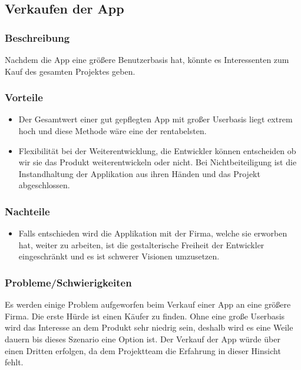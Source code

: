 \documentclass[FIPLY_base.tex]{subfiles}
\begin{document}
\subsection{Verkaufen der App}


\subsubsection{Beschreibung}
Nachdem die App eine größere Benutzerbasis hat, könnte es Interessenten zum Kauf des gesamten Projektes geben.


\subsubsection{Vorteile}
\begin{itemize}
\item Der Gesamtwert einer gut gepflegten App mit großer Userbasis liegt extrem hoch und diese Methode wäre eine der rentabelsten.
\item Flexibilität bei der Weiterentwicklung, die Entwickler können entscheiden ob wir sie das Produkt weiterentwickeln oder nicht. Bei Nichtbeiteiligung ist die Instandhaltung der Applikation aus ihren Händen und das Projekt abgeschlossen.
\end{itemize}

\subsubsection{Nachteile}
\begin{itemize}
\item Falls entschieden wird die Applikation mit der Firma, welche sie erworben hat, weiter zu arbeiten, ist die gestalterische Freiheit der Entwickler eingeschränkt und es ist schwerer Visionen umzusetzen.
\end{itemize}


\subsubsection{Probleme/Schwierigkeiten}
Es werden einige Problem aufgeworfen beim Verkauf einer App an eine größere Firma. Die erste Hürde ist einen Käufer zu finden.
Ohne eine große Userbasis wird das Interesse an dem Produkt sehr niedrig sein, deshalb wird es eine Weile dauern bis dieses Szenario eine Option ist.
Der Verkauf der App würde über einen Dritten erfolgen, da dem Projektteam die Erfahrung in dieser Hinsicht fehlt.
\end{document}
